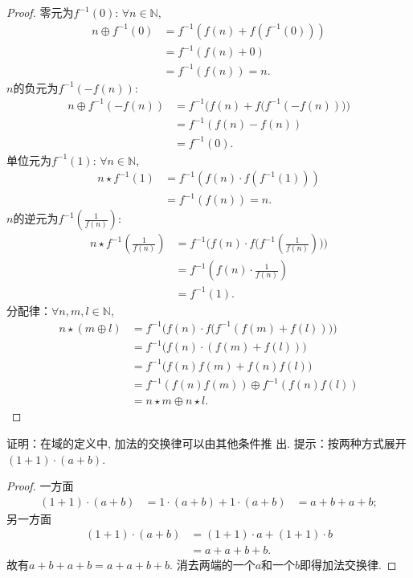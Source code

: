 \begin{proof}
    零元为$f^{-1}(0)$: $\forall n \in \mathbb{N}$,
\[
\begin{aligned}
    n \oplus f^{-1}(0) &= f^{-1}(f(n) + f(f^{-1}(0)))\\
    &= f^{-1}(f(n) + 0)\\
    &= f^{-1}(f(n)) = n.
\end{aligned}
\]
    $n$的负元为$f^{-1}(-f(n))$:
\[
\begin{aligned}
    n \oplus f^{-1}(-f(n)) &= f^{-1}\biggl(f(n) + f\bigl(f^{-1}(-f(n))\bigr)\biggr)\\
    &= f^{-1}(f(n) - f(n))\\
    &= f^{-1}(0).
\end{aligned}
\]
    单位元为$f^{-1}(1)$: $\forall n \in \mathbb{N}$,
\[
\begin{aligned}
    n \star f^{-1}(1) &= f^{-1}(f(n) \cdot f(f^{-1}(1)))\\
    &= f^{-1}(f(n)) = n.
\end{aligned}
\]
    $n$的逆元为$f^{-1}(\frac1{f(n)})$:
\[
\begin{aligned}
    n \star f^{-1}(\frac{1}{f(n)}) &= f^{-1}\biggl(f(n) \cdot f\bigl(f^{-1}(\frac{1}{f(n)})\bigr)\biggr)\\
    &= f^{-1}(f(n) \cdot \frac{1}{f(n)})\\
    &= f^{-1}(1).
\end{aligned}
\]
    分配律：$\forall n, m, l \in \mathbb{N}$,
\[
\begin{aligned}
    n \star (m \oplus l) &= f^{-1}\biggl(f(n) \cdot f\bigl(f^{-1}(f(m) + f(l))\bigr)\biggr)\\
    &= f^{-1}\bigl(f(n) \cdot (f(m) + f(l))\bigr)\\
    &= f^{-1}\bigl(f(n)f(m) + f(n)f(l)\bigr)\\
    &= f^{-1}(f(n)f(m)) \oplus f^{-1}(f(n)f(l))\\
    &= n \star m \oplus n \star l.
\end{aligned}
\]
\end{proof}

\begin{problem}\label{ex:1.1.5}
    证明：在域的定义中, 加法的交换律可以由其他条件推
出. 提示：按两种方式展开 $(1 + 1) \cdot (a + b)$.
\end{problem}

\begin{proof}
    一方面
\[
\begin{aligned}
    (1 + 1) \cdot (a + b) &= 1 \cdot (a + b) + 1 \cdot (a + b)
    &= a + b + a + b;
\end{aligned}    
\]
    另一方面
\[
\begin{aligned}
    (1 + 1) \cdot (a + b) &= (1 + 1) \cdot a + (1 + 1) \cdot b\\
    &= a + a + b + b.
\end{aligned}
\]
故有$a + b + a + b = a + a + b + b$.
消去两端的一个$a$和一个$b$即得加法交换律.
\end{proof}

